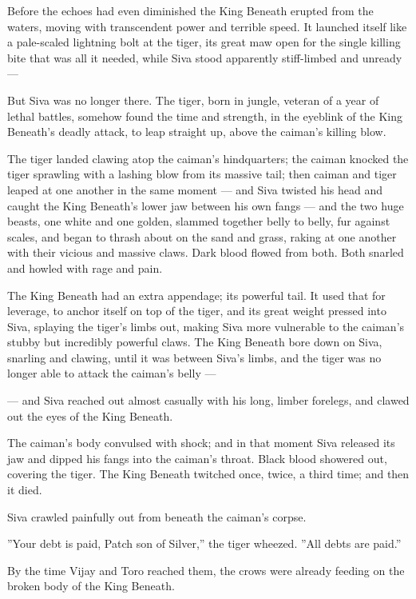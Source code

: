 \documentclass[12pt]{book}
\begin{document}
Before the echoes had even diminished the King Beneath erupted from the waters, moving with transcendent power and terrible speed. It launched itself like a pale-scaled lightning bolt at the tiger, its great maw open for the single killing bite that was all it needed, while Siva stood apparently stiff-limbed and unready ---

But Siva was no longer there. The tiger, born in jungle, veteran of a year of lethal battles, somehow found the time and strength, in the eyeblink of the King Beneath's deadly attack, to leap straight up, above the caiman's killing blow.

The tiger landed clawing atop the caiman's hindquarters; the caiman knocked the tiger sprawling with a lashing blow from its massive tail; then caiman and tiger leaped at one another in the same moment ---
and Siva twisted his head and caught the King Beneath's lower jaw between his own fangs ---
and the two huge beasts, one white and one golden, slammed together belly to belly, fur against scales, and began to thrash about on the sand and grass, raking at one another with their vicious and massive claws. Dark blood flowed from both. Both snarled and howled with rage and pain.

The King Beneath had an extra appendage; its powerful tail. It used that for leverage, to anchor itself on top of the tiger, and its great weight pressed into Siva, splaying the tiger's limbs out, making Siva more vulnerable to the caiman's stubby but incredibly powerful claws. The King Beneath bore down on Siva, snarling and clawing, until it was between Siva's limbs, and the tiger was no longer able to attack the caiman's belly ---

---
and Siva reached out almost casually with his long, limber forelegs, and clawed out the eyes of the King Beneath.

The caiman's body convulsed with shock; and in that moment Siva released its jaw and dipped his fangs into the caiman's throat. Black blood showered out, covering the tiger. The King Beneath twitched once, twice, a third time; and then it died.

Siva crawled painfully out from beneath the caiman's corpse.

''Your debt is paid, Patch son of Silver,'' the tiger wheezed. ''All debts are paid.''

By the time Vijay and Toro reached them, the crows were already feeding on the broken body of the King Beneath.


\chapter{}
\end{document}
